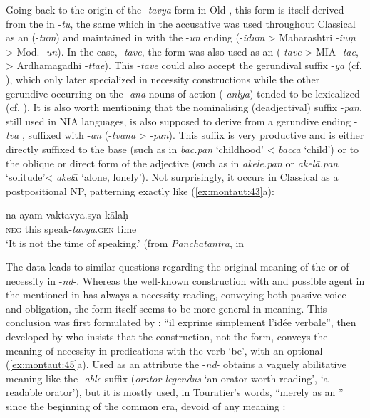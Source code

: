 \documentclass[output=paper]{langsci/langscibook}
\begin{document}
Going back to the origin of the -\textit{tavya} form in Old , this form is itself derived from the  in -\textit{tu}, the same which in the accusative was used throughout Classical  as an  (-\textit{tum}) and maintained in  with the -\textit{un}  ending (-\textit{idum} > Maharashtri -\textit{iuṃ} > Mod.  -\textit{un}). In the  case, -\textit{tave}, the form was also used as an  (-\textit{tave} > MIA -\textit{tae}, > Ardhamagadhi -\textit{ttae}). This -\textit{tave}  could also accept the gerundival suffix -\textit{ya} (cf. \citealt[612--615]{Debrunner1954}), which only later specialized in necessity constructions while the other gerundive occurring on the -\textit{ana} nouns of action (-\textit{anlya}) tended to be lexicalized (cf. \citealt[190]{Bubenik1998}). It is also worth mentioning that the nominalising (deadjectival) suffix -\textit{pan}, still used in NIA languages, is also supposed to derive from a gerundive ending -\textit{tva} \citep{Tagare1948}, suffixed with -\textit{an} (-\textit{tvana} > -\textit{pan}). This suffix is very productive and is either directly suffixed to the base (such as in \textit{bac.pan} ‘childhood’ {\textless} \textit{baccā} ‘child’) or to the oblique or direct form of the adjective (such as in \textit{akele.pan} or \textit{akelā.pan} ‘solitude’{ {\textless}} {\textit{akel}ā} ‘alone, lonely’). Not surprisingly, it occurs in Classical  as a postpositional NP, patterning exactly like (\ref{ex:montaut:43}a): 


\ea
\label{ex:montaut:44}
\gll na  ayam vaktavya.sya  kālaḥ\\
\textsc{neg}   this   speak-\textit{tavya}.\textsc{gen}   time \\
\glt ‘It is not the time of speaking.’ (from \textit{Panchatantra}, in \citep[278]{Bloch1970[1920]}
\z 

The  data leads to similar questions regarding the original meaning of the  or  of necessity in -\textit{nd}{}-. Whereas the well-known construction with  and possible agent in the  mentioned in  has always a necessity reading, conveying both passive voice and obligation, the form itself seems to be more general in meaning. This conclusion was first formulated by \citet[285]{ErnoultThomas1951}: “il exprime simplement l’idée verbale”, then developed by \citet[164ff]{Touratier1994} who insists that the construction, not the form, conveys the meaning of necessity in predications with the verb ‘be’, with an optional  (\ref{ex:montaut:45}a). Used as an attribute the -\textit{nd}{}-  obtains a vaguely abilitative meaning like the -\textit{able} suffix (\textit{orator legendus} ‘an orator worth reading’, ‘a readable orator’), but it is mostly used, in Touratier’s words, “merely as an ” since the beginning of the common era, devoid of any  meaning :
\end{document}
